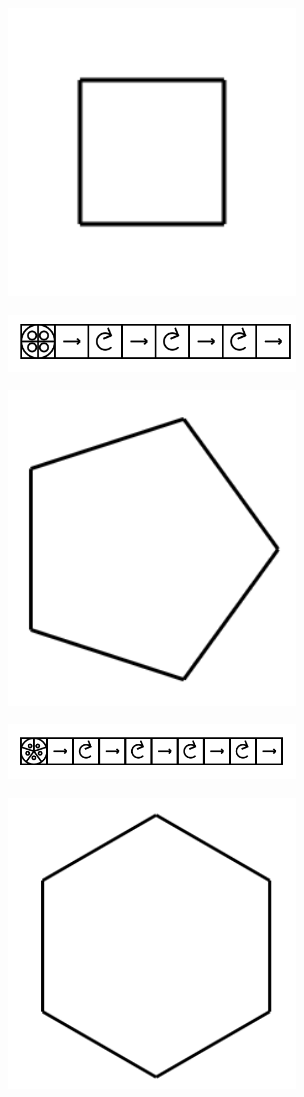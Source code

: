 \documentclass[11pt]{article}
\begin{document}
\includegraphics[width=3in]{image4.png}





\includegraphics[width=3in]{image5.png}





\includegraphics[width=3in]{image6.png}

\includegraphics[width=3in]{image7.png}





\includegraphics[width=3in]{image8.png}
\end{document}
